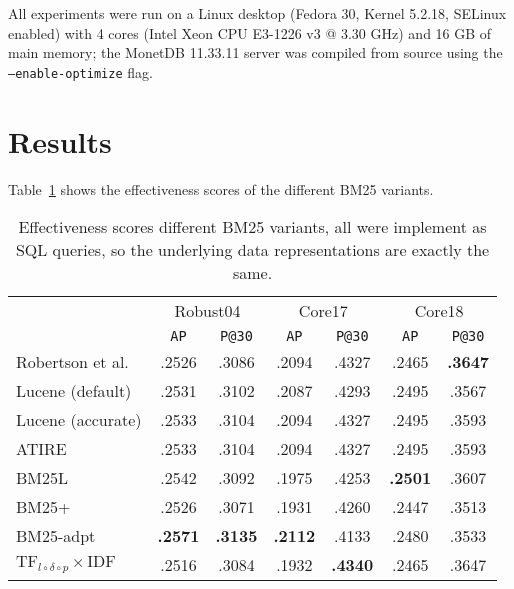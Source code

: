 All experiments were run on a Linux desktop (Fedora 30, Kernel 5.2.18, SELinux enabled) with 4 cores (Intel Xeon CPU E3-1226 v3 @ 3.30 GHz) and 16 GB of main memory; the MonetDB 11.33.11 server was compiled from source using the \texttt{---enable-optimize} flag.


\section{Results}
Table~\ref{bm25_variant_results} shows the effectiveness scores of the different BM25 variants.  

\begin{table}
	\centering
	\caption{Effectiveness scores different BM25 variants, all were implement as SQL queries, so the underlying data representations are exactly the same. }
	\label{bm25_variant_results}
	\begin{tabular}{l c c c c c c}
		\toprule
		&\multicolumn{2}{c}{Robust04}&\multicolumn{2}{c}{Core17}&\multicolumn{2}{c}{Core18}\\
		&\texttt{AP}&\texttt{P@30}&\texttt{AP}&\texttt{P@30}&\texttt{AP}&\texttt{P@30}\\
		\midrule
		{\small Robertson et al.} & .2526 & .3086 & .2094 & .4327 & .2465 & \textbf{.3647} \\ 
		{\small Lucene (default)} & .2531 & .3102 & .2087 & .4293 & .2495 & .3567 \\ 
		{\small Lucene (accurate)} & .2533 & .3104 & .2094 & .4327 & .2495 & .3593 \\ 
		{\small ATIRE} & .2533 & .3104 & .2094 & .4327 & .2495 & .3593 \\ 
		{\small BM25L} & .2542 & .3092 & .1975 & .4253 & \textbf{.2501} & .3607 \\ 
		{\small BM25+} & .2526 & .3071 & .1931 & .4260 & .2447 & .3513 \\ 
		{\small BM25-adpt} & \textbf{.2571} & \textbf{.3135} & \textbf{.2112} & .4133 & .2480 & .3533\\ 
		{\small $\text{TF}_{l\circ\delta\circ p}\times\text{IDF}$} & .2516 & .3084 & .1932 & \textbf{.4340} & .2465 & .3647\\ 
		\bottomrule
	\end{tabular}
\end{table}

